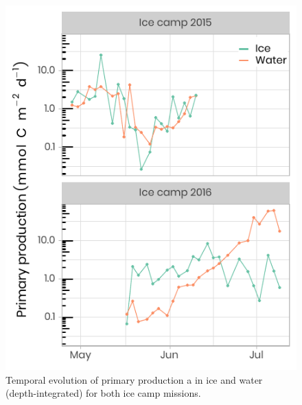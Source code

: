 \documentclass[12pt,a4paper]{scrartcl}
\begin{document}
\begin{figure}[h]
	\centering
	\includegraphics[scale = 1]{../../../graphs/fig11.pdf}
	\caption{Temporal evolution of primary production a in ice and water (depth-integrated) for both ice camp missions.}
\end{figure}

\clearpage
\newpage
\end{document}
